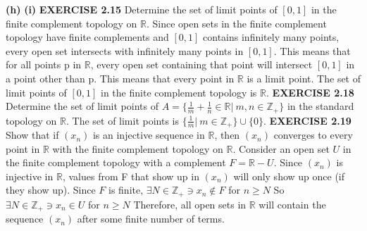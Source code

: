 \documentclass[12pt]{article}
\begin{document}
  \textbf{(h)}  \newline
  \textbf{(i)} 
  \newpage
  \noindent
  \textbf{EXERCISE 2.15} Determine the set of limit points of \([0,1]\) in the finite complement topology on \(\mathbb{R}\).
  \newline \newline
  Since open sets in the finite complement topology have finite complements and \([0,1]\) contains infinitely many points, every open set intersects with infinitely many points in \([0,1]\).
  \newline \newline
  This means that for all points p in \(\mathbb{R}\), every open set containing that point will intersect \([0,1]\) in a point other than p. This means that every point in \(\mathbb{R}\) is a limit point.
  \newline \newline
  The set of limit points of \([0,1]\) in the finite complement topology is \(\mathbb{R}\).
  \newpage
  \noindent
  \textbf{EXERCISE 2.18} Determine the set of limit points of \(A = \{\frac{1}{m} + \frac{1}{n} \in \mathbb{R}|\ m,n\in \mathbb{Z}_+\}\) in the standard topology on \(\mathbb{R}\).
  \newline \newline
  The set of limit points is \(\{\frac{1}{m}|\ m \in \mathbb{Z}_+\} \cup \{0\}\).
  \newpage
  \noindent
  \textbf{EXERCISE 2.19} Show that if \((x_n)\) is an injective sequence in \(\mathbb{R}\), then \((x_n)\) converges to every point in \(\mathbb{R}\) with the finite complement topology on \(\mathbb{R}\).
  \newline \newline
  Consider an open set \(U\) in the finite complement topology with a complement \(F = \mathbb{R} - U\).
  \newline \newline
  Since \((x_n)\) is injective in \(\mathbb{R}\), values from F that show up in \((x_n)\) will only show up once (if they show up).
  \newline \newline
  Since \(F\) is finite, \(\exists N \in \mathbb{Z}_+ \ni x_n \notin F\) for \(n \geq N\)
  \newline
  So \(\exists N \in \mathbb{Z}_+ \ni x_n \in U\) for \(n \geq N\)
  \newline \newline
  Therefore, all open sets in \(\mathbb{R}\) will contain the sequence \((x_n)\) after some finite number of terms.
\end{document}
